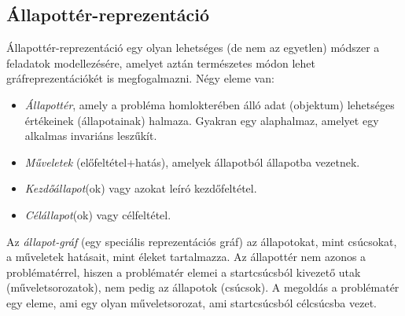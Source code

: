 \documentclass[margin=0px]{article}
\begin{document}
\subsection{Állapottér-reprezentáció}

Állapottér-reprezentáció egy olyan lehetséges (de nem az egyetlen) módszer a feladatok modellezésére, amelyet aztán természetes módon lehet gráfreprezentációkét is megfogalmazni. Négy eleme van:
\begin{itemize}
    \item \textit{Állapottér}, amely a probléma homlokterében álló adat (objektum) lehetséges értékeinek (állapotainak) halmaza. Gyakran egy alaphalmaz, amelyet egy alkalmas invariáns leszűkít.
    \item \textit{Műveletek} (előfeltétel+hatás), amelyek állapotból állapotba vezetnek.
    \item \textit{Kezdőállapot}(ok) vagy azokat leíró kezdőfeltétel.
    \item \textit{Célállapot}(ok) vagy célfeltétel.
\end{itemize}
Az \textit{állapot-gráf} (egy speciális reprezentációs gráf) az állapotokat, mint csúcsokat, a műveletek hatásait, mint éleket tartalmazza.
Az állapottér nem azonos a problématérrel, hiszen a problématér elemei a startcsúcsból kivezető utak (műveletsorozatok), nem pedig az állapotok (csúcsok). A megoldás a problématér egy eleme, ami egy olyan műveletsorozat, ami startcsúcsból célcsúcsba vezet.
\end{document}
